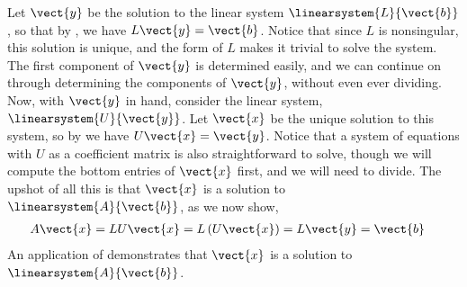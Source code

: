 Let $\vect{y}$ be the solution to the linear system $\linearsystem{L}{\vect{b}}$, so that by , we have $L\vect{y}=\vect{b}$.  Notice that since $L$ is nonsingular, this solution is unique, and the form of $L$ makes it trivial to solve the system.  The first component of $\vect{y}$ is determined easily, and we can continue on through determining the components of $\vect{y}$, without even ever dividing.  Now, with $\vect{y}$ in hand, consider the linear system, $\linearsystem{U}{\vect{y}}$.  Let $\vect{x}$ be the unique solution to this system, so by  we have $U\vect{x}=\vect{y}$.  Notice that a system of equations with $U$ as a coefficient matrix is also straightforward to solve, though we will compute the bottom entries of $\vect{x}$ first, and we will need to divide.  The upshot of all this is that $\vect{x}$ is a solution to $\linearsystem{A}{\vect{b}}$, as we now show,
%
\begin{align*}
A\vect{x}
&=LU\vect{x}
=L\left(U\vect{x}\right)
=L\vect{y}
=\vect{b}
\end{align*}
%
An application of  demonstrates that $\vect{x}$ is a solution to $\linearsystem{A}{\vect{b}}$.
%
